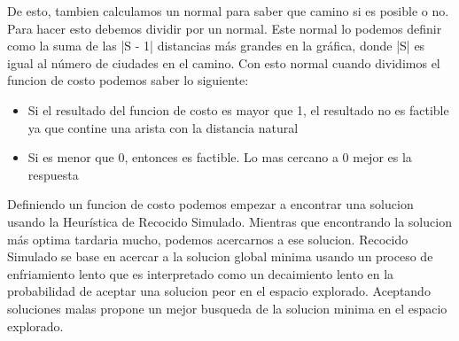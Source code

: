 \documentclass{article}
\begin{document}
    De esto, tambien calculamos un normal para saber que camino si es posible o no. Para hacer esto debemos
    dividir por un normal. Este normal lo podemos definir como la suma de las |S - 1| distancias más grandes
    en la gráfica, donde |S| es igual al número de ciudades en el camino. Con esto normal cuando dividimos el
    funcion de costo podemos saber lo siguiente:\\
\begin{itemize}
    \item Si el resultado del funcion de costo es mayor que 1, el resultado no es factible ya que contine
    una arista con la distancia natural
    \item Si es menor que 0, entonces es factible. Lo mas cercano a 0 mejor es la respuesta
\end{itemize}
    
    Definiendo un funcion de costo podemos empezar a encontrar una solucion usando la Heurística de
    Recocido Simulado. Mientras que encontrando la solucion más optima tardaria mucho, podemos acercarnos
    a ese solucion. Recocido Simulado se base en acercar a la solucion global minima usando un proceso
    de enfriamiento lento que es interpretado como un decaimiento lento en la probabilidad de
    aceptar una solucion peor en el espacio explorado. Aceptando soluciones malas propone un mejor busqueda
    de la solucion minima en el espacio explorado.
    
\end{document}
